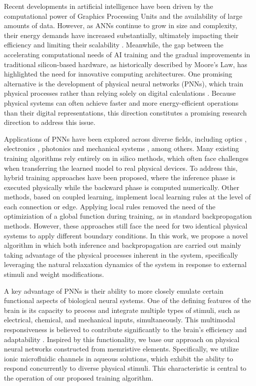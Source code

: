 \documentclass[reprint,superscriptaddress,prb,showkeys]{revtex4-2}
\begin{document}
Recent developments in artificial intelligence have been driven by the computational power of Graphics Processing Units and the availability of large amounts of data. However, as ANNs continue to grow in size and complexity, their energy demands have increased substantially, ultimately impacting their efficiency and limiting their scalability \cite{energy_cost_ml1, energy_cost_ml2}. Meanwhile, the gap between the accelerating computational needs of AI training and the gradual improvements in traditional silicon-based hardware, as historically described by Moore’s Law, has highlighted the need for innovative computing architectures. One promising alternative is the development of physical neural networks (PNNs), which train physical processes rather than relying solely on digital calculations \cite{trainingphysicalneuralnetworks,backporp_pnn}. Because physical systems can often achieve faster and more energy-efficient operations than their digital representations, this direction constitutes a promising research direction to address this issue.

Applications of PNNs have been explored across diverse fields, including optics \cite{optics1}, electronics \cite{electronics1}, photonics \cite{acoustic1} and mechanical systems \cite{mechanics1}, among others. Many existing training algorithms rely entirely on in silico methods, which often face challenges when transferring the learned model to real physical devices. To address this, hybrid training approaches have been proposed, where the inference phase is executed physically while the backward phase is computed numerically\cite{backporp_pnn}. Other methods, based on coupled learning\cite{supervised_learning}, implement local learning rules at the level of each connection or edge\cite{demonstr_coupled_learning}. Applying local rules removed the need of the optimiziation of a global function during training, as in standard backpropagation methods. However, these approaches still face the need for two identical physical systems to apply different boundary conditions. In this work, we propose a novel algorithm in which both inference and backpropagation are carried out mainly taking advantage of the physical processes inherent in the system, specifically leveraging the natural relaxation dynamics of the system in response to external stimuli and weight modifications.

A key advantage of PNNs is their ability to more closely emulate certain functional aspects of biological neural systems. One of the defining features of the brain is its capacity to process and integrate multiple types of stimuli, such as electrical, chemical, and mechanical inputs, simultaneously. This multimodal responsiveness is believed to contribute significantly to the brain’s efficiency and adaptability \cite{}. Inspired by this functionality, we base our approach on physical neural networks constructed from memristive elements. Specifically, we utilize ionic microfluidic channels in aqueous solutions\cite{Rene_IonicNeuromorphic}, which exhibit the ability to respond concurrently to diverse physical stimuli. This characteristic is central to the operation of our proposed training algorithm.
\end{document}
